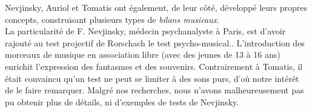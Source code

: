 Nevjinsky, Auriol et Tomatis ont également, de leur côté, développé
leurs propres concepts, construisant plusieurs types 
de \emph{bilans musicaux}.
\\
La particularité de F. Nevjinsky, médecin psychanalyste à
  Paris, est d'avoir rajouté au test projectif de Rorschach le test psycho-musical.\autocite{nevjinsky:adolescence}.
L'introduction des morceaux de musique en association libre (avec
 des jeunes de 13 à 16 ans) enrichit l'expression des fantasmes et des
 souvenirs. %
Contrairement à Tomatis,
 il était convaincu qu'un test ne peut 
se limiter à des sons purs, d'où notre intérêt de le faire remarquer. Malgré nos recherches, nous n'avons 
malheureusement pas pu obtenir plus de détails, ni d'exemples de tests de Nevjinsky.
